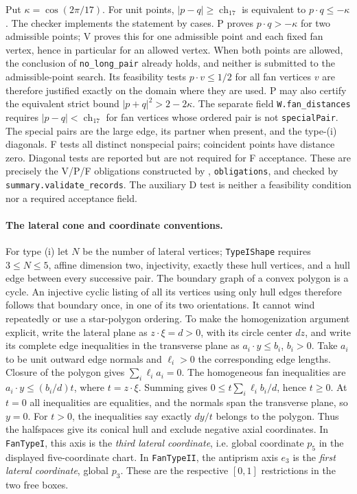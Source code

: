 \documentclass[11pt]{article}
\theoremstyle{definition}
\theoremstyle{remark}
\newcommand{\ch}{\operatorname{ch}}
\newcommand{\file}[1]{\path{#1}}
\begin{document}
Put $\kappa=\cos(2\pi/17)$. For unit points,
$|p-q|\ge\ch_{17}$ is equivalent to $p\cdot q\le-\kappa$.
The checker implements the statement by cases. P proves
$p\cdot q>-\kappa$ for two admissible points; V proves this for one
admissible point and each fixed fan vertex, hence in particular for an
allowed vertex. When both points are allowed, the conclusion of
\texttt{no\_long\_pair} already holds, and neither is submitted to the
admissible-point search. Its feasibility tests $p\cdot v\le1/2$ for
all fan vertices $v$ are therefore justified exactly on the domain
where they are used. P may also certify the equivalent strict bound
$|p+q|^2>2-2\kappa$.
The separate field \texttt{W.fan\_distances} requires
$|p-q|<\ch_{17}$ for fan vertices whose ordered pair is not
\texttt{specialPair}. The special pairs are the large edge, its partner
when present, and the type-(i) diagonals. F tests all distinct
nonspecial pairs; coincident points have distance zero. Diagonal tests
are reported but are not required for F acceptance. These are precisely
the V/P/F obligations constructed by
\file{checks/check_caseb/inventory.py}, \texttt{obligations}, and
checked by \texttt{summary.validate\_records}. The auxiliary D test
is neither a feasibility condition nor a required acceptance field.

\paragraph{The lateral cone and coordinate conventions.}
For type (i) let $N$ be the number of lateral vertices;
\texttt{TypeIShape} requires $3\le N\le5$, affine dimension two,
injectivity, exactly these hull vertices, and a hull edge between every
successive pair. The boundary graph of a convex polygon is a cycle.
An injective cyclic listing of all its vertices using only hull edges
therefore follows that boundary once, in one of its two orientations.
It cannot wind repeatedly or use a star-polygon ordering.
To make the homogenization argument explicit, write the lateral plane
as $z\cdot\xi=d>0$, with its circle center $dz$, and write its complete
edge inequalities in the transverse plane as
$a_i\cdot y\le b_i$, $b_i>0$. Take $a_i$ to be unit outward edge
normals and $\ell_i>0$ the corresponding edge lengths. Closure of the
polygon gives $\sum_i\ell_i a_i=0$. The homogeneous fan inequalities
are
$a_i\cdot y\le(b_i/d)t$, where $t=z\cdot\xi$.
Summing gives $0\le t\sum_i\ell_i b_i/d$, hence $t\ge0$.
At $t=0$ all inequalities are equalities, and the normals span the
transverse plane, so $y=0$. For $t>0$, the inequalities say exactly
$dy/t$ belongs to the polygon. Thus the halfspaces give its conical
hull and exclude negative axial coordinates.
In \texttt{FanTypeI}, this axis is the \emph{third lateral coordinate},
i.e. global coordinate $p_5$ in the displayed five-coordinate chart.
In \texttt{FanTypeII}, the antiprism axis $e_3$ is the
\emph{first lateral coordinate}, global $p_3$.
These are the respective $[0,1]$ restrictions in the two free boxes.
\end{document}

